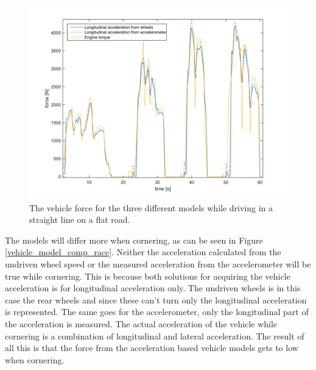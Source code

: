 \begin{figure}[h]
	\centering
	\includegraphics[width=1\textwidth]{Pictures/vehicle_model_comp_olikaacc}
	\caption{The vehicle force for the three different models while driving in a straight line on a flat road.}
	\label{vehicle_model_comp_olikaacc}
\end{figure}

The models will differ more when cornering, as can be seen in Figure \ref{vehicle_model_comp_race}. Neither the acceleration calculated from the undriven wheel speed or the measured acceleration from the accelerometer will be true while cornering. This is because both solutions for acquiring the vehicle acceleration is for longitudinal acceleration only. The undriven wheels is in this case the rear wheels and since these can't turn only the longitudinal acceleration is represented. The same goes for the accelerometer, only the longitudinal part of the acceleration is measured. The actual acceleration of the vehicle while cornering is a combination of longitudinal and lateral acceleration. The result of all this is that the force from the acceleration based vehicle models gets to low when cornering. 

